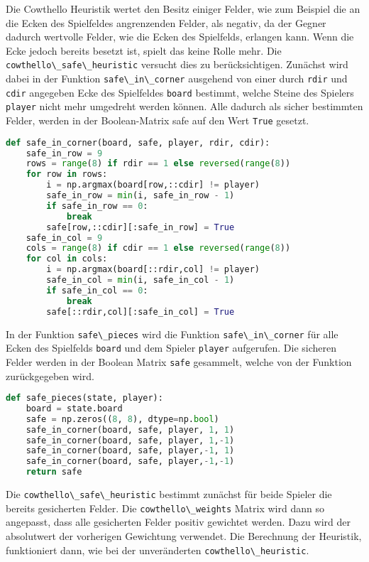 Die Cowthello Heuristik wertet den Besitz einiger Felder, wie zum
Beispiel die an die Ecken des Spielfeldes angrenzenden Felder, als
negativ, da der Gegner dadurch wertvolle Felder, wie die Ecken des
Spielfelds, erlangen kann. Wenn die Ecke jedoch bereits besetzt ist,
spielt das keine Rolle mehr. Die
\passthrough{\lstinline!cowthello\_safe\_heuristic!} versucht dies zu
berücksichtigen. Zunächst wird dabei in der Funktion
\passthrough{\lstinline!safe\_in\_corner!} ausgehend von einer durch
\passthrough{\lstinline!rdir!} und \passthrough{\lstinline!cdir!}
angegeben Ecke des Spielfeldes \passthrough{\lstinline!board!} bestimmt,
welche Steine des Spielers \passthrough{\lstinline!player!} nicht mehr
umgedreht werden können. Alle dadurch als sicher bestimmten Felder,
werden in der Boolean-Matrix safe auf den Wert
\passthrough{\lstinline!True!} gesetzt.

\begin{lstlisting}[language=Python]
def safe_in_corner(board, safe, player, rdir, cdir):
    safe_in_row = 9
    rows = range(8) if rdir == 1 else reversed(range(8))
    for row in rows:
        i = np.argmax(board[row,::cdir] != player)
        safe_in_row = min(i, safe_in_row - 1)
        if safe_in_row == 0:
            break
        safe[row,::cdir][:safe_in_row] = True
    safe_in_col = 9
    cols = range(8) if cdir == 1 else reversed(range(8))
    for col in cols:
        i = np.argmax(board[::rdir,col] != player)
        safe_in_col = min(i, safe_in_col - 1)
        if safe_in_col == 0:
            break
        safe[::rdir,col][:safe_in_col] = True
\end{lstlisting}

In der Funktion \passthrough{\lstinline!safe\_pieces!} wird die Funktion
\passthrough{\lstinline!safe\_in\_corner!} für alle Ecken des Spielfelds
\passthrough{\lstinline!board!} und dem Spieler
\passthrough{\lstinline!player!} aufgerufen. Die sicheren Felder werden
in der Boolean Matrix \passthrough{\lstinline!safe!} gesammelt, welche
von der Funktion zurückgegeben wird.

\begin{lstlisting}[language=Python]
def safe_pieces(state, player):
    board = state.board
    safe = np.zeros((8, 8), dtype=np.bool)
    safe_in_corner(board, safe, player, 1, 1)
    safe_in_corner(board, safe, player, 1,-1)
    safe_in_corner(board, safe, player,-1, 1)
    safe_in_corner(board, safe, player,-1,-1)
    return safe
\end{lstlisting}

Die \passthrough{\lstinline!cowthello\_safe\_heuristic!} bestimmt
zunächst für beide Spieler die bereits gesicherten Felder. Die
\passthrough{\lstinline!cowthello\_weights!} Matrix wird dann so
angepasst, dass alle gesicherten Felder positiv gewichtet werden. Dazu
wird der absolutwert der vorherigen Gewichtung verwendet. Die Berechnung
der Heuristik, funktioniert dann, wie bei der unveränderten
\passthrough{\lstinline!cowthello\_heuristic!}.

